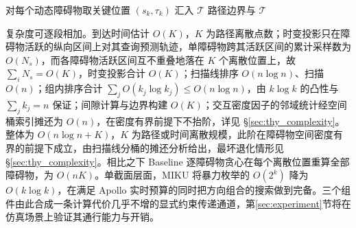 \documentclass[a4paper,11pt]{ctexart}
\theoremstyle{definition}
\begin{document}
\begin{algorithm}[htbp]
\caption{MIKU 多障碍物统一规划求解}
\label{alg:miku}
对每个动态障碍物取关键位置 $(s_k, \tau_k)$ 汇入 $\mathcal{T}$\;
\KwRet 路径边界与 $\mathcal{T}$
\end{algorithm}

复杂度可逐段相加。到达时间估计 $O(K)$，$K$ 为路径离散点数；时变投影只在障碍物活跃的纵向区间上对其查询预测轨迹，单障碍物跨其活跃区间的累计采样数为 $O(N_s)$，而各障碍物活跃区间互不重叠地落在 $K$ 个离散位置上，故 $\sum_i N_s = O(K)$，时变投影合计 $O(K)$；扫描线排序 $O(n\log n)$、扫描 $O(n)$；组内排序合计 $\sum_j O(k_j\log k_j)\leq O(n\log n)$，由 $k\log k$ 的凸性与 $\sum_j k_j = n$ 保证；间隙计算与边界构建 $O(K)$；交互密度因子的邻域统计经空间桶索引摊还为 $O(n)$，在密度有界前提下不抬阶，详见 §\ref{sec:thy_complexity}。整体为 $O(n\log n + K)$，$K$ 为路径或时间离散规模，此阶在障碍物空间密度有界的前提下成立，由扫描线分桶的摊还分析给出，最坏退化情形见 §\ref{sec:thy_complexity}。相比之下 Baseline 逐障碍物贪心在每个离散位置重算全部障碍物，为 $O(nK)$。单截面层面，MIKU 将暴力枚举的 $O(2^k)$ 降为 $O(k\log k)$，在满足 Apollo 实时预算的同时把方向组合的搜索做到完备。三个组件由此合成一条计算代价几乎不增的显式约束传递通道，第\ref{sec:experiment}节将在仿真场景上验证其通行能力与开销。

\makeatletter
{}
\makeatother
\end{document}
